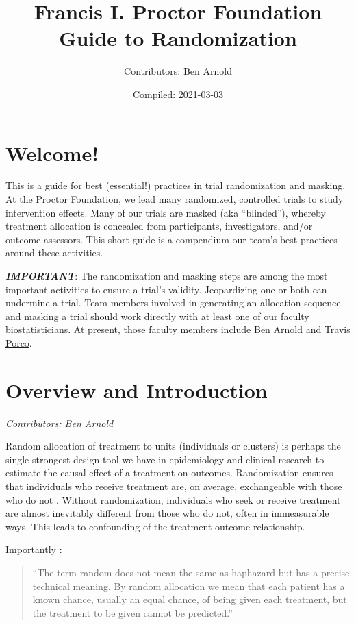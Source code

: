 \documentclass[
]{book}
\title{Francis I. Proctor Foundation Guide to Randomization}
\author{Contributors: Ben Arnold}
\date{Compiled: 2021-03-03}
\begin{document}
\maketitle

{
\setcounter{tocdepth}{1}
\tableofcontents
}
\hypertarget{welcome}{%
\chapter*{Welcome!}\label{welcome}}

This is a guide for best (essential!) practices in trial randomization and masking. At the Proctor Foundation, we lead many randomized, controlled trials to study intervention effects. Many of our trials are masked (aka ``blinded''), whereby treatment allocation is concealed from participants, investigators, and/or outcome assessors. This short guide is a compendium our team's best practices around these activities.

\emph{\textbf{IMPORTANT}}: The randomization and masking steps are among the most important activities to ensure a trial's validity. Jeopardizing one or both can undermine a trial. Team members involved in generating an allocation sequence and masking a trial should work directly with at least one of our faculty biostatisticians. At present, those faculty members include \href{https://profiles.ucsf.edu/benjamin.arnold}{Ben Arnold} and \href{https://profiles.ucsf.edu/travis.porco}{Travis Porco}.

\hypertarget{overview}{%
\chapter{Overview and Introduction}\label{overview}}

\emph{Contributors: Ben Arnold}

Random allocation of treatment to units (individuals or clusters) is perhaps the single strongest design tool we have in epidemiology and clinical research to estimate the causal effect of a treatment on outcomes. Randomization ensures that individuals who receive treatment are, on average, exchangeable with those who do not \citep{Altman1999-zc}. Without randomization, individuals who seek or receive treatment are almost inevitably different from those who do not, often in immeasurable ways. This leads to confounding of the treatment-outcome relationship.

Importantly \citep{Altman1999-zc}:

\begin{quote}
``The term random does not mean the same as haphazard but has a precise technical meaning. By random allocation we mean that each patient has a known chance, usually an equal chance, of being given each treatment, but the treatment to be given cannot be predicted.''
\end{quote}
\end{document}
